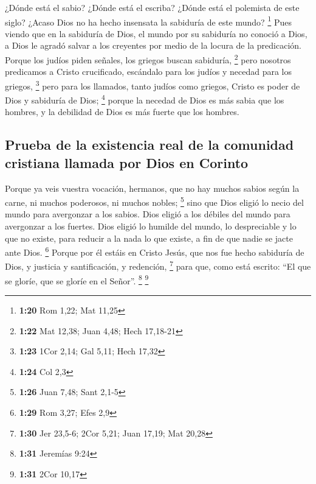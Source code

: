 \begin{paracol}{2}
 ¿Dónde está el sabio? ¿Dónde está el escriba? ¿Dónde
está el polemista de este siglo? ¿Acaso Dios no ha hecho insensata la
sabiduría de este mundo? \footnote{\textbf{1:20} Rom 1,22; Mat 11,25}
 Pues viendo que en la sabiduría de Dios, el mundo por su
sabiduría no conoció a Dios, a Dios le agradó salvar a los creyentes por
medio de la locura de la predicación.  Porque los judíos
piden señales, los griegos buscan sabiduría, \footnote{\textbf{1:22} Mat
  12,38; Juan 4,48; Hech 17,18-21}  pero nosotros
predicamos a Cristo crucificado, escándalo para los judíos y necedad
para los griegos, \footnote{\textbf{1:23} 1Cor 2,14; Gal 5,11; Hech
  17,32}  pero para los llamados, tanto judíos como
griegos, Cristo es poder de Dios y sabiduría de Dios; \footnote{\textbf{1:24}
  Col 2,3}  porque la necedad de Dios es más sabia que
los hombres, y la debilidad de Dios es más fuerte que los hombres.

\hypertarget{prueba-de-la-existencia-real-de-la-comunidad-cristiana-llamada-por-dios-en-corinto}{%
\subsection{Prueba de la existencia real de la comunidad cristiana
llamada por Dios en
Corinto}\label{prueba-de-la-existencia-real-de-la-comunidad-cristiana-llamada-por-dios-en-corinto}}

 Porque ya veis vuestra vocación, hermanos, que no hay
muchos sabios según la carne, ni muchos poderosos, ni muchos nobles;
\footnote{\textbf{1:26} Juan 7,48; Sant 2,1-5}  sino que
Dios eligió lo necio del mundo para avergonzar a los sabios. Dios eligió
a los débiles del mundo para avergonzar a los fuertes. 
Dios eligió lo humilde del mundo, lo despreciable y lo que no existe,
para reducir a la nada lo que existe,  a fin de que nadie
se jacte ante Dios. \footnote{\textbf{1:29} Rom 3,27; Efes 2,9}
 Porque por él estáis en Cristo Jesús, que nos fue hecho
sabiduría de Dios, y justicia y santificación, y redención, \footnote{\textbf{1:30}
  Jer 23,5-6; 2Cor 5,21; Juan 17,19; Mat 20,28}  para
que, como está escrito: ``El que se gloríe, que se gloríe en el Señor''.
\footnote{\textbf{1:31} Jeremías 9:24} \footnote{\textbf{1:31} 2Cor
  10,17}

\switchcolumn
\begin{otherlanguage}{english}


\end{otherlanguage}
\end{paracol}

